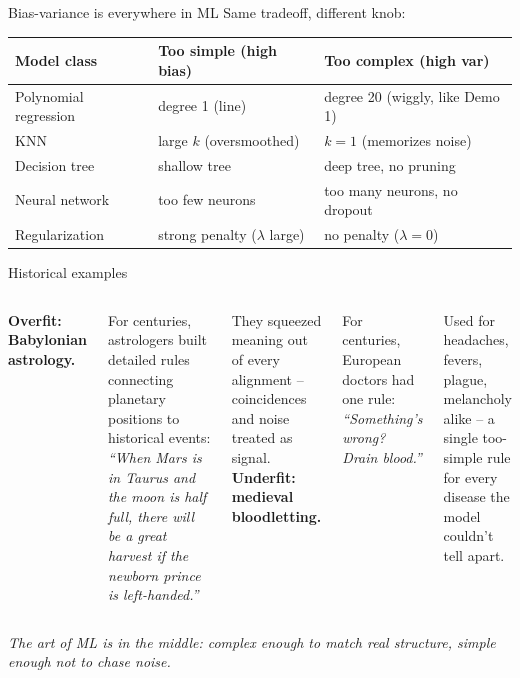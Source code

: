 \documentclass[aspectratio=169]{beamer}
\begin{document}
\begin{frame}{Bias-variance is everywhere in ML}
  Same tradeoff, different knob:
  \vfill
  \begin{center}\small
  \renewcommand{\arraystretch}{1.4}
  \begin{tabular}{lll}
    \textbf{Model class} & \textbf{Too simple (high bias)} & \textbf{Too complex (high var)} \\
    \hline
    Polynomial regression & degree 1 (line) & degree 20 (wiggly, like Demo 1) \\
    KNN & large $k$ (oversmoothed) & $k = 1$ (memorizes noise) \\
    Decision tree & shallow tree & deep tree, no pruning \\
    Neural network & too few neurons & too many neurons, no dropout \\
    Regularization & strong penalty ($\lambda$ large) & no penalty ($\lambda = 0$) \\
    \hline
  \end{tabular}
  \end{center}
  \vfill
\end{frame}

\begin{frame}{Historical examples}
  \begin{columns}[T]
    \textbf{Overfit: Babylonian astrology.}

    For centuries, astrologers built detailed rules connecting planetary positions to historical events:
    \emph{``When Mars is in Taurus and the moon is half full, there will be a great harvest if the newborn prince is left-handed.''}

    They squeezed meaning out of every alignment -- coincidences and noise treated as signal.
    \textbf{Underfit: medieval bloodletting.}

    For centuries, European doctors had one rule:
    \emph{``Something's wrong? Drain blood.''}

    Used for headaches, fevers, plague, melancholy alike -- a single too-simple rule for every disease the model couldn't tell apart.
  \end{columns}
  \vfill
  \emph{The art of ML is in the middle: complex enough to match real structure, simple enough not to chase noise.}
\end{frame}
\end{document}
